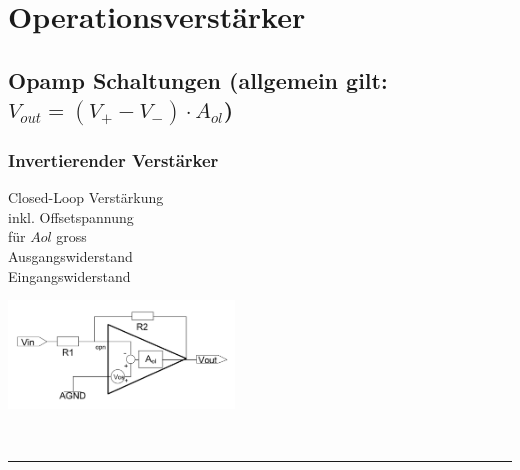 \newcommand{\titleinfo}{Elektronik 1 - Formelsammlung}
\newcommand{\authorinfo}{F. Braun, L. Schmid, U. Giger, R. Koller, S.Arnold, S.Ferretti, A.Waldvogel}
\newcommand{\versioninfo}{powered by \LaTeX}
%
%




\newpage
	\section{Operationsverstärker}
		\subsection{Opamp Schaltungen (allgemein gilt: $V_{out} = (V_+ - V_-)\cdot A_{ol}$)}
		\subsubsection{Invertierender Verstärker}
			\begin{minipage}[T]{13cm}
                Closed-Loop Verst\"arkung
                \hspace{3mm}\\
		        inkl. Offsetspannung
		        \hspace{10.2mm}\\
                f\"ur $A{ol}$ gross
                \hspace{22mm}\\
           	    Ausgangswiderstand    \hspace{10.5mm}\\
            	Eingangswiderstand    \hspace{11mm}
            \end{minipage}
			\begin{minipage}{6cm}
            	\includegraphics[width=6cm]{./bilder/i-verstaerker.png}
            \end{minipage}\\
\hrule

